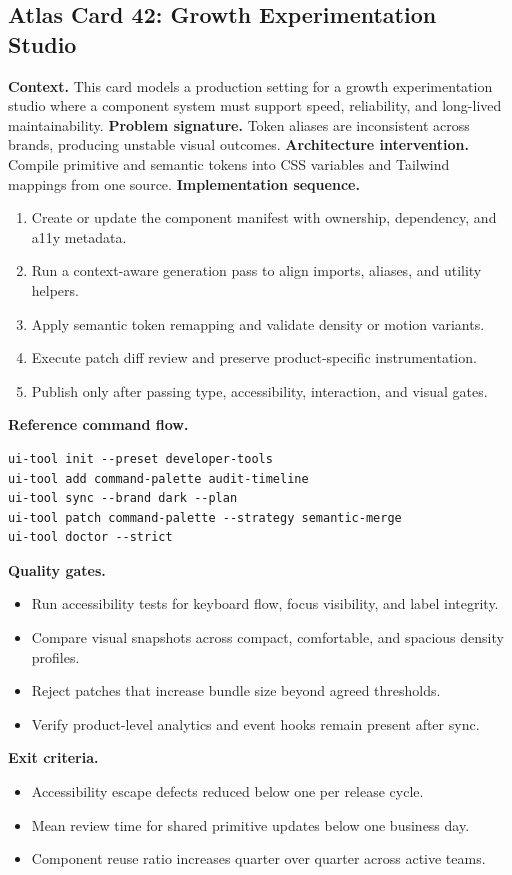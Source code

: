 \subsection*{Atlas Card 42: Growth Experimentation Studio}
\textbf{Context.} This card models a production setting for a growth experimentation studio where a component system must support speed, reliability, and long-lived maintainability.
\textbf{Problem signature.} Token aliases are inconsistent across brands, producing unstable visual outcomes.
\textbf{Architecture intervention.} Compile primitive and semantic tokens into CSS variables and Tailwind mappings from one source.
\textbf{Implementation sequence.}
\begin{enumerate}[leftmargin=*, itemsep=0.28em]
  \item Create or update the component manifest with ownership, dependency, and a11y metadata.
  \item Run a context-aware generation pass to align imports, aliases, and utility helpers.
  \item Apply semantic token remapping and validate density or motion variants.
  \item Execute patch diff review and preserve product-specific instrumentation.
  \item Publish only after passing type, accessibility, interaction, and visual gates.
\end{enumerate}
\textbf{Reference command flow.}
\begin{verbatim}
ui-tool init --preset developer-tools
ui-tool add command-palette audit-timeline
ui-tool sync --brand dark --plan
ui-tool patch command-palette --strategy semantic-merge
ui-tool doctor --strict
\end{verbatim}
\textbf{Quality gates.}
\begin{itemize}[leftmargin=*, itemsep=0.24em]
  \item Run accessibility tests for keyboard flow, focus visibility, and label integrity.
  \item Compare visual snapshots across compact, comfortable, and spacious density profiles.
  \item Reject patches that increase bundle size beyond agreed thresholds.
  \item Verify product-level analytics and event hooks remain present after sync.
\end{itemize}
\textbf{Exit criteria.}
\begin{itemize}[leftmargin=*, itemsep=0.24em]
  \item Accessibility escape defects reduced below one per release cycle.
  \item Mean review time for shared primitive updates below one business day.
  \item Component reuse ratio increases quarter over quarter across active teams.
\end{itemize}
\clearpage
